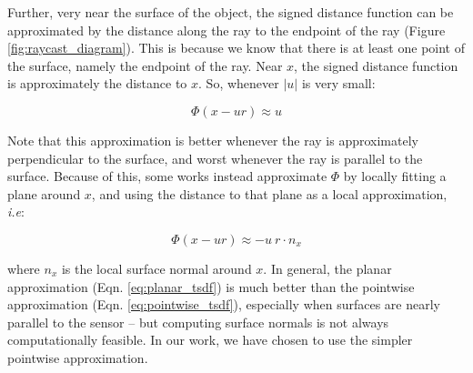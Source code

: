 % 

Further, very near the surface of the object, the signed distance function can
be approximated by the distance along the ray to the endpoint of  the ray
(Figure \ref{fig:raycast_diagram}). This is because we know that there is at
least one point of the surface, namely the endpoint of the ray.  Near $x$, the
signed distance function is approximately the distance to $x$. So, whenever
$|u|$ is very small:

\begin{equation} 
\label{eq:pointwise_tsdf} 
	\Phi(x - ur) \approx u 
\end{equation}

Note that this approximation is better whenever the ray is approximately
perpendicular to the surface, and worst whenever the ray is parallel to the
surface. Because of this, some works \cite{Bylow2013} instead approximate
$\Phi$ by locally fitting a plane around $x$, and using the distance to that
plane as a local approximation, \emph{i.e}:

\begin{equation} 
\label{eq:planar_tsdf} 
	\Phi(x - ur) \approx -u~r \cdot n_x
\end{equation}

\noindent where $n_x$ is the local surface normal around $x$. In general, the
planar approximation (Eqn. \ref{eq:planar_tsdf}) is much better than the
pointwise approximation (Eqn. \ref{eq:pointwise_tsdf}), especially when surfaces
are nearly parallel to the sensor -- but computing surface normals is not
always computationally feasible. In our work, we have chosen to use
the simpler pointwise approximation.

